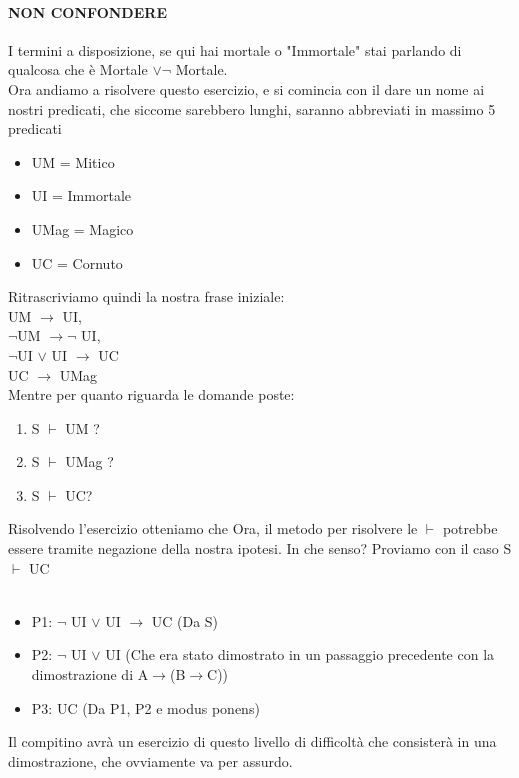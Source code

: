 \documentclass[12pt, a4paper, openany, oneside]{book}
\begin{document}
{\paragraph{NON CONFONDERE} I termini a disposizione, se qui hai mortale o "Immortale"
stai parlando di qualcosa che è Mortale $\vee \neg$ Mortale. \\
Ora andiamo a risolvere questo esercizio, e si comincia con il dare un nome
ai nostri predicati, che siccome sarebbero lunghi, saranno abbreviati in massimo
5 predicati
\begin{itemize}
	\item UM = Mitico
	\item UI = Immortale 
	\item UMag = Magico
	\item UC = Cornuto
\end{itemize}
Ritrascriviamo quindi la nostra frase iniziale: \\
UM $\to$ UI, \\
$\neg$UM $\to \neg$ UI, \\
$\neg$UI $\vee$ UI $\to$ UC \\
UC $\to$ UMag \\
Mentre per quanto riguarda le domande poste:
\begin{enumerate}
	\item S $\vdash$ UM ?
	\item S $\vdash$ UMag ?
	\item S $\vdash$ UC?
\end{enumerate}
Risolvendo l'esercizio otteniamo che
Ora, il metodo per risolvere le $\vdash$ potrebbe essere tramite negazione della
nostra ipotesi. In che senso? Proviamo con il caso S $\vdash$ UC \\ \\
\begin{itemize}
	\item P1: $\neg$ UI $\vee$ UI $\to$ UC (Da S)
	\item P2: $\neg$ UI $\vee$ UI (Che era stato dimostrato in un passaggio 
	precedente con la dimostrazione di A$\to$(B$\to$C))
	\item P3: UC (Da P1, P2 e modus ponens)
\end{itemize} 
Il compitino avrà un esercizio di questo livello di difficoltà che consisterà in
una dimostrazione, che ovviamente va per assurdo.
}
\end{document}
